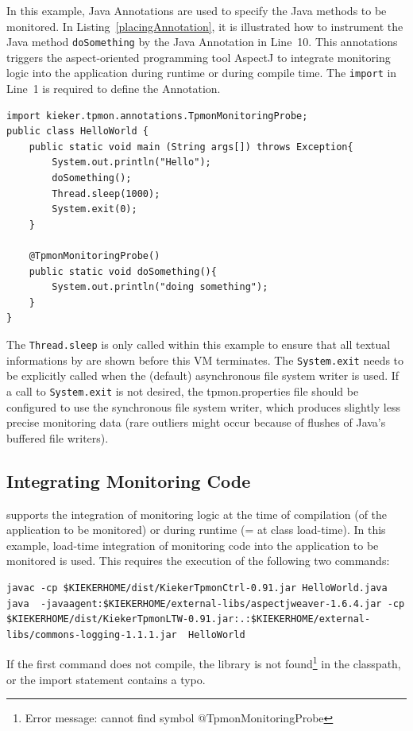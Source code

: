 \documentclass[a4paper,12pt]{scrartcl}
\begin{document}
In this example, Java Annotations are used to specify the Java methods to be monitored. In Listing~\ref{placingAnnotation}, it is illustrated how to instrument the Java method \texttt{doSomething} by the Java Annotation in Line~10. This annotations triggers the aspect-oriented programming tool AspectJ to integrate monitoring logic into the application during runtime or during compile time. The \texttt{import} in Line~1 is required to define the Annotation.

\begin{lstlisting}[caption={Lines 1 and 10 are added to instrument this simple ``Hello World'' Java program.},label={placingAnnotation}]
import kieker.tpmon.annotations.TpmonMonitoringProbe;
public class HelloWorld {
	public static void main (String args[]) throws Exception{
		System.out.println("Hello");
		doSomething();
		Thread.sleep(1000);
		System.exit(0);
	}

	@TpmonMonitoringProbe()
	public static void doSomething(){
		System.out.println("doing something");
	}
}
\end{lstlisting}

The \texttt{Thread.sleep} is only called within this example to ensure that all textual informations by \tpmon{} are shown before this VM terminates. The \texttt{System.exit} needs to be explicitly called when the (default) asynchronous file system writer is used. If a call to \texttt{System.exit} is not desired, the tpmon.properties file should be configured to use the synchronous file system writer, which produces slightly less precise monitoring data (rare outliers might occur because of flushes of Java's buffered file writers).

\subsection{Integrating Monitoring Code}
\tpmon{} supports the integration of monitoring logic at the time of compilation (of the application to be monitored) or during runtime (= at class load-time). In this example, load-time integration of monitoring code into the application to be monitored is used. This requires the execution of the following two commands:

\begin{lstlisting}[caption={Compilation and execution with AspectJ's Java agent.},label={javaHelloWorld}]
javac -cp $KIEKERHOME/dist/KiekerTpmonCtrl-0.91.jar HelloWorld.java
java  -javaagent:$KIEKERHOME/external-libs/aspectjweaver-1.6.4.jar -cp $KIEKERHOME/dist/KiekerTpmonLTW-0.91.jar:.:$KIEKERHOME/external-libs/commons-logging-1.1.1.jar  HelloWorld
\end{lstlisting}
If the first command does not compile, the \tpmon{} library is not found\footnote{Error message: cannot find symbol @TpmonMonitoringProbe} in the classpath, or the import statement contains a typo.
\end{document}
